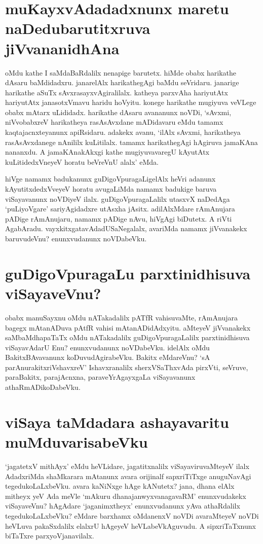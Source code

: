 \section*{muKayxvAdadadxnunx maretu naDedubarutitxruva jiVvananidhAna}

oMdu kathe I saMdaBaRdalilx nenapige barutetx. hiMde obabx harikathe dAsaru baMdidadxru. janarelAlx harikathegAgi baMdu seVridaru. janarige harikathe aSuTx  sAvxrasayxvAgiralilalx. katheya parxvAha hariyutAtx hariyutAtx janasotxVmavu haridu hoVyitu. konege harikathe mugiyuva veVLege obabx mAtarx uLididadx. harikathe dAsaru avananunx noVDi, `sAvxmi, niVvobabxreV harikatheya rasAsAvxdane mADidavaru eMdu tamamx kaqtajacnxteyanunx apiRsidaru. adakekx avanu, `ilAlx sAvxmi, harikatheya rasAsAvxdanege nAnililx kuLitilalx. tamamx harikathegAgi hAgiruva jamaKAna nananxdu. A jamaKAnakAkxgi kathe mugiyuvavaregU kAyutAtx kuLitidedxVneyeV horatu beVreVnU alalx' eMda.

hiVge namamx badukanunx guDigoVpuragaLigelAlx heVri adanunx kAyutitxdedxVveyeV horatu avugaLiMda namamx badukige baruva viSayavanunx noVDiyeV ilalx. guDigoVpuragaLalilx utasxvX naDedAga `puLiyoVgare' sariyAgidadxre utAsxha jAsitx. adilAlxMdare rAmAnujara pADige rAmAnujaru, namamx pADige nAvu, hiVgAgi biDutetx. A riVti AgabAradu. vayxkitxgatavAdadUSaNegalalx, avariMda namamx jiVvanakekx baruvudeVnu? enunxvudanunx noVDabeVku.

\section*{guDigoVpuragaLu parxtinidhisuva viSayaveVnu?}

obabx manuSayxnu oMdu nATakadalilx pATfR vahisuvaMte, rAmAnujara bagegx mAtanADuva pAtfR vahisi mAtanADidAdxyitu. aMteyeV jiVvanakekx saMbaMdhapaTaTx oMdu nATakadalilx guDigoVpuragaLalilx parxtinidhisuva viSayavAdarU Enu? enunxvudanunx noVDabeVku. idelAlx oMdu BakitxBAvavanunx  koDuvudAgirabeVku. Bakitx eMdareVnu? `sA parAnurakitxriVshavxreV' Ishavxranalilx sherxVSaThxvAda pirxVti, seVruve, paraBakitx, parajAcnxna, paraveYrAgayxgaLa viSayavanunx athaRmADikoDabeVku.

\section*{viSaya taMdadara ashayavaritu muMduvarisabeVku}

`jagatetxV mithAyx' eMdu heVLidare, jagatitxnalilx viSayaviruvaMteyeV ilalx AdadxriMda shaMkarara mAtanunx avara orijinalf sapxriTiTxge anuguNavAgi tegedukoLaLxbeVku. avara kaNiNxge hAge kANutetx? jana, dhana elAlx mitheyx yeV Ada meVle `mAkuru dhanajanwyxvanagavaRM'\label{60} enunxvudakekx viSayaveVnu? hAgAdare `jaganimxtheyx' enunxvudanunx yAva athaRdalilx tegedukoLaLxbeVku? eMdare barxhamx oMdanenxV noVDi avaraMteyeV noVDi heVLuva pakaSxdalilx elalxrU hAgeyeV heVLabeVkAguvudu. A sipxriTaTxnunx biTaTxre parxyoVjanavilalx.

